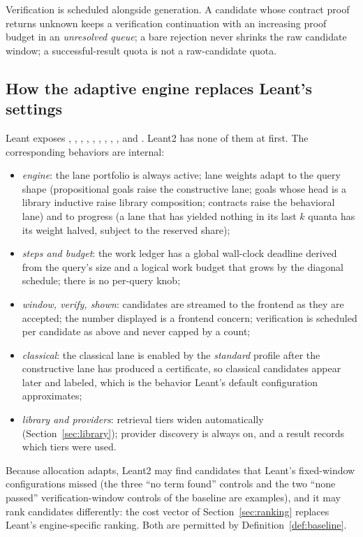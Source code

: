 Verification is scheduled alongside generation. A candidate whose contract proof returns unknown keeps a verification continuation with an increasing proof budget in an \emph{unresolved queue}; a bare rejection never shrinks the raw candidate window; a successful-result quota is not a raw-candidate quota.

\subsection{How the adaptive engine replaces Leant's settings}\label{sec:adaptive}

Leant exposes , , , , , , , , , and . Leant2 has none of them at first. The corresponding behaviors are internal:
\begin{itemize}
\item \emph{engine}: the lane portfolio is always active; lane weights adapt to the query shape (propositional goals raise the constructive lane; goals whose head is a library inductive raise library composition; contracts raise the behavioral lane) and to progress (a lane that has yielded nothing in its last $k$ quanta has its weight halved, subject to the reserved share);
\item \emph{steps and budget}: the work ledger has a global wall-clock deadline derived from the query's size and a logical work budget that grows by the diagonal schedule; there is no per-query knob;
\item \emph{window, verify, shown}: candidates are streamed to the frontend as they are accepted; the number displayed is a frontend concern; verification is scheduled per candidate as above and never capped by a count;
\item \emph{classical}: the classical lane is enabled by the \emph{standard} profile after the constructive lane has produced a certificate, so classical candidates appear later and labeled, which is the behavior Leant's default configuration approximates;
\item \emph{library and providers}: retrieval tiers widen automatically (Section~\ref{sec:library}); provider discovery is always on, and a result records which tiers were used.
\end{itemize}
Because allocation adapts, Leant2 may find candidates that Leant's fixed-window configurations missed (the three ``no term found'' controls and the two ``none passed'' verification-window controls of the baseline are examples), and it may rank candidates differently: the cost vector of Section~\ref{sec:ranking} replaces Leant's engine-specific ranking. Both are permitted by Definition~\ref{def:baseline}.

